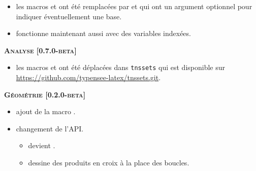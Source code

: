 \documentclass[12pt,a4paper]{book}
\begin{document}
\begin{description}
\begin{itemize}[itemsep=.5em]
    
        \item {}
              les macros  et  ont été remplacées par  et  qui ont un argument optionnel pour indiquer éventuellement une base.
    
    
        \item {}
               fonctionne maintenant aussi avec des variables indexées.
              
    \end{itemize}
    
    
    \begin{center}
        \textbf{\textsc{Analyse [0.7.0-beta]}}
    \end{center}
    
    \begin{itemize}[itemsep=.5em]
        \item {}
              les macros  et  ont été déplacées dans \verb#tnssets# qui est disponible sur \url{https://github.com/typensee-latex/tnssets.git}.
        
    \end{itemize}
    
    
    \separation
    
    
    
    
    \begin{center}
        \textbf{\textsc{Géométrie [0.2.0-beta]}}
    \end{center}
    
    \begin{itemize}[itemsep=.5em]
        \item {}
              ajout de la macro .
    
    
        \item {} changement de l'API.
        \begin{itemize}[itemsep=.5em]
            \item {} devient .
    
            \item {} dessine des produits en croix à la place des boucles.
        \end{itemize}
    

\end{itemize}
\end{description}
\end{document}
